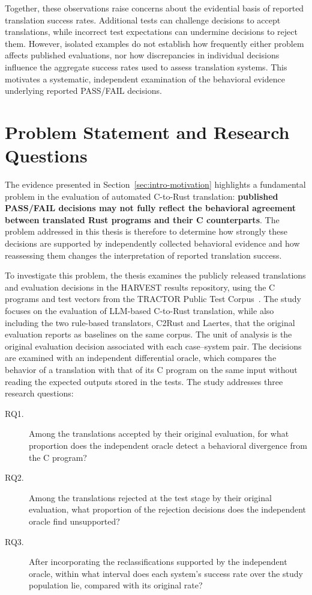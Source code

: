 Together, these observations raise concerns about the evidential basis of reported translation success rates. Additional tests can challenge decisions to accept translations, while incorrect test expectations can undermine decisions to reject them. However, isolated examples do not establish how frequently either problem affects published evaluations, nor how discrepancies in individual decisions influence the aggregate success rates used to assess translation systems. This motivates a systematic, independent examination of the behavioral evidence underlying reported PASS/FAIL decisions.

\section{Problem Statement and Research Questions}\label{sec:intro-problem}

The evidence presented in Section~\ref{sec:intro-motivation} highlights a fundamental problem in the evaluation of automated C-to-Rust translation: \textbf{published PASS/FAIL decisions may not fully reflect the behavioral agreement between translated Rust programs and their C counterparts}. The problem addressed in this thesis is therefore to determine how strongly these decisions are supported by independently collected behavioral evidence and how reassessing them changes the interpretation of reported translation success.

To investigate this problem, the thesis examines the publicly released translations and evaluation decisions in the HARVEST results repository, using the C programs and test vectors from the TRACTOR Public Test Corpus~\cite{harvest-results,tractor-test-corpus}. The study focuses on the evaluation of LLM-based C-to-Rust translation, while also including the two rule-based translators, C2Rust and Laertes, that the original evaluation reports as baselines on the same corpus. The unit of analysis is the original evaluation decision associated with each case--system pair. The decisions are examined with an independent differential oracle, which compares the behavior of a translation with that of its C program on the same input without reading the expected outputs stored in the tests. The study addresses three research questions:

\begin{description}
\item[RQ1.] Among the translations accepted by their original evaluation, for what proportion does the independent oracle detect a behavioral divergence from the C program?
\item[RQ2.] Among the translations rejected at the test stage by their original evaluation, what proportion of the rejection decisions does the independent oracle find unsupported?
\item[RQ3.] After incorporating the reclassifications supported by the independent oracle, within what interval does each system's success rate over the study population lie, compared with its original rate?
\end{description}

